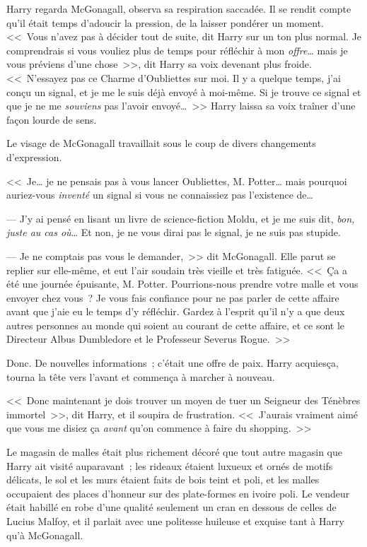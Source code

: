 Harry regarda McGonagall, observa sa respiration saccadée. Il se rendit compte qu'il était temps d'adoucir la pression, de la laisser pondérer un moment. <<~Vous n'avez pas à décider tout de suite, dit Harry sur un ton plus normal. Je comprendrais si vous vouliez plus de temps pour réfléchir à mon \emph{offre}… mais je vous préviens d'une chose~>>, dit Harry sa voix devenant plus froide. <<~N'essayez pas ce Charme d'Oubliettes sur moi. Il y a quelque temps, j'ai conçu un signal, et je me le suis déjà envoyé à moi-même. Si je trouve ce signal et que je ne me \emph{souviens} pas l'avoir envoyé…~>> Harry laissa sa voix traîner d'une façon lourde de sens.

Le visage de McGonagall travaillait sous le coup de divers changements d'expression.

<<~Je… je ne pensais pas à vous lancer Oubliettes, M. Potter… mais pourquoi auriez-vous \emph{inventé} un signal si vous ne connaissiez pas l'existence de…

--- J'y ai pensé en lisant un livre de science-fiction Moldu, et je me suis dit, \emph{bon, juste au cas où}… Et non, je ne vous dirai pas le signal, je ne suis pas stupide.

--- Je ne comptais pas vous le demander,~>> dit McGonagall. Elle parut se replier sur elle-même, et eut l'air soudain très vieille et très fatiguée. <<~Ça a été une journée épuisante, M. Potter. Pourrions-nous prendre votre malle et vous envoyer chez vous~? Je vous fais confiance pour ne pas parler de cette affaire avant que j'aie eu le temps d'y réfléchir. Gardez à l'esprit qu'il n'y a que deux autres personnes au monde qui soient au courant de cette affaire, et ce sont le Directeur Albus Dumbledore et le Professeur Severus Rogue.~>>

Donc. De nouvelles informations~; c'était une offre de paix. Harry acquiesça, tourna la tête vers l'avant et commença à marcher à nouveau.

<<~Donc maintenant je dois trouver un moyen de tuer un Seigneur des Ténèbres immortel~>>, dit Harry, et il soupira de frustration. <<~J'aurais vraiment aimé que vous me disiez ça \emph{avant} qu'on commence à faire du shopping.~>>

\later

Le magasin de malles était plus richement décoré que tout autre magasin que Harry ait visité auparavant~; les rideaux étaient luxueux et ornés de motifs délicats, le sol et les murs étaient faits de bois teint et poli, et les malles occupaient des places d'honneur sur des plate-formes en ivoire poli. Le vendeur était habillé en robe d'une qualité seulement un cran en dessous de celles de Lucius Malfoy, et il parlait avec une politesse huileuse et exquise tant à Harry qu'à McGonagall.


